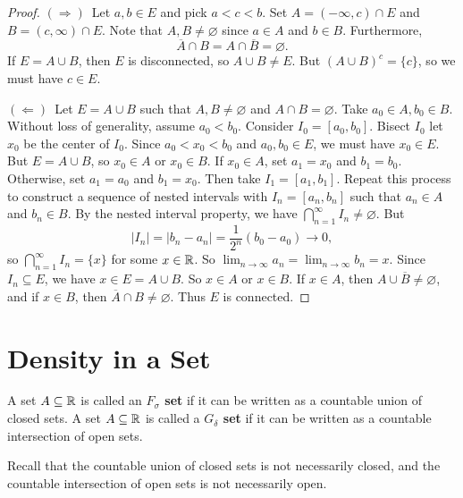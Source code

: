 \begin{proof}
  $(\Rightarrow)$\, Let $a, b \in E$ and pick $a < c < b$.
  Set $A = (-\infty, c) \cap E$ and $B = (c, \infty) \cap E$.
  Note that $A, B \ne \varnothing$ since $a \in A$ and $b \in B$.
  Furthermore,
  \[\overline{A} \cap B = A \cap \overline{B} = \varnothing.\]
  If $E = A \cup B$, then $E$ is disconnected, so
  $A \cup B \ne E$.
  But $(A \cup B)^c = \{c\}$, so we must have
  $c \in E$.

  $(\Leftarrow)$\, Let $E = A \cup B$
  such that $A, B \ne \varnothing$ and $A \cap B = \varnothing$.
  Take $a_0 \in A, b_0 \in B$. Without loss of generality,
  assume $a_0 < b_0$. Consider $I_0 = [a_0, b_0]$. Bisect
  $I_0$ let $x_0$ be the center of $I_0$. Since
  $a_0 < x_0 < b_0$ and $a_0, b_0 \in E$, we must have
  $x_0 \in E$. But $E = A \cup B$, so $x_0 \in A$ or $x_0 \in B$.
  If $x_0 \in A$, set $a_1 = x_0$ and $b_1 = b_0$. Otherwise,
  set $a_1 = a_0$ and $b_1 = x_0$. Then take $I_1 = [a_1, b_1]$.
  Repeat this process to construct a sequence of nested intervals
  with $I_n = [a_n, b_n]$ such that $a_n \in A$ and $b_n \in B$.
  By the nested interval property, we have
  $\bigcap_{n = 1}^\infty I_n \ne \varnothing$. But
  \[|I_n| = |b_n - a_n| = \frac{1}{2^n}(b_0 - a_0) \to 0,\]
  so $\bigcap_{n = 1}^\infty I_n = \{x\}$ for some $x \in \mathbb{R}$.
  So $\lim_{n \to \infty} a_n = \lim_{n \to \infty} b_n = x$.
  Since $I_n \subseteq E$, we have $x \in E = A \cup B$. So
  $x \in A$ or $x \in B$. If $x \in A$, then
  $A \cup \overline{B} \ne \varnothing$, and if $x \in B$, then
  $\overline{A} \cap B \ne \varnothing$. Thus $E$ is connected.
\end{proof}

\section{Density in a Set}
\begin{definition}
  A set $A \subseteq \mathbb{R}$ is called an \textbf{$F_\sigma$ set}
  if it can be written as a countable union of closed sets.
  A set $A \subseteq \mathbb{R}$ is called a \textbf{$G_\delta$ set}
  if it can be written as a countable intersection of open sets.
\end{definition}

\begin{remark}
  Recall that the countable union of closed sets is not necessarily
  closed, and the countable intersection of open sets is not
  necessarily open.
\end{remark}

